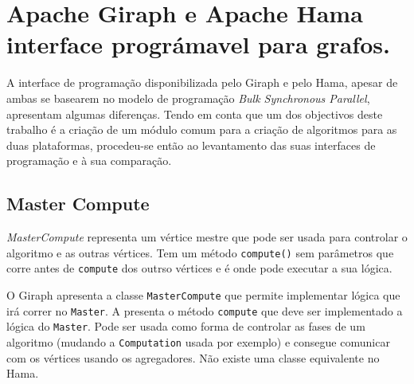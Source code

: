 \chapter{Apache Giraph e Apache Hama interface prográmavel para grafos.}

A interface de programação disponibilizada pelo Giraph e pelo Hama, apesar de ambas se basearem no modelo de programação \textit{Bulk Synchronous Parallel}, apresentam algumas diferenças. Tendo em conta que um dos objectivos deste trabalho é a criação de um módulo comum para a criação de algoritmos para as duas plataformas, procedeu-se então ao levantamento das suas interfaces de programação e à sua comparação. 

\section{Master Compute}
\textit{MasterCompute} representa um vértice mestre que pode ser usada para controlar o algoritmo e as outras vértices. Tem um método \texttt{compute()} sem parâmetros que corre antes de \texttt{compute} dos outrso vértices e é onde pode executar a sua lógica.


O Giraph apresenta a classe \texttt{MasterCompute} que permite implementar lógica que irá correr no \texttt{Master}. A presenta o método \texttt{compute} que deve ser implementado a lógica do \texttt{Master}. Pode ser usada como forma de controlar as fases de um algoritmo (mudando a \texttt{Computation} usada por exemplo) e consegue comunicar com os vértices usando os agregadores. Não existe uma classe equivalente no Hama.











%
